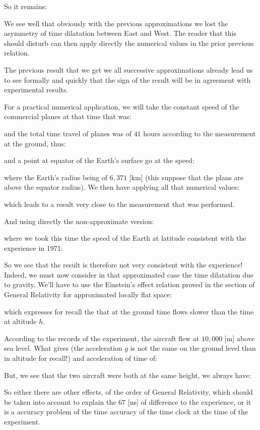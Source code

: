 	So it remains:
	
	We see well that obviously with the previous approximations we lost the asymmetry of time dilatation between East and West. The reader that this should disturb can then apply directly the numerical values in the prior previous relation.

	The previous result that we get we all successive approximations already lead us to see formally and quickly that the sign of the result will be in agreement with experimental results.

	For a practical numerical application, we will take the constant speed of the commercial planes at that time that was:
	
	and the total time travel of planes was of $41$ hours according to the measurement at the ground, thus:
	
	and a point at equator of the Earth's surface go at the speed:
	
	where the Earth's radius being of $6,371$ [km] (this suppose that the plans are above the equator radius). We then have applying all that numerical values:
	
	which leads to a result very close to the measurement that was performed.

	And using directly the non-approximate version:
	
	where we took this time the speed of the Earth at latitude consistent with the experience in 1971:
	
	So we see that the result is therefore not very consistent with the experience! Indeed, we must now consider in that approximated case the time dilatation due to gravity. We'll have to use the Einstein's effect relation proved in the section of General Relativity for approximated locally flat space:
	
	which expresses for recall the that at the ground time flows slower than the time at altitude $h$.
	
	According to the records of the experiment, the aircraft flew at $10,000$ [m] above sea level. What gives (the acceleration $g$ is not the same on the ground level than in altitude for recall!) and acceleration of time of:
	
	But, we see that the two aircraft were both at the same height, we always have:
	
	So either there are other effects, of the order of General Relativity, which should be taken into account to explain the $67$ [ns] of difference to the experience, or it is a accuracy problem of the time accuracy of the time clock at the time of the experiment.


